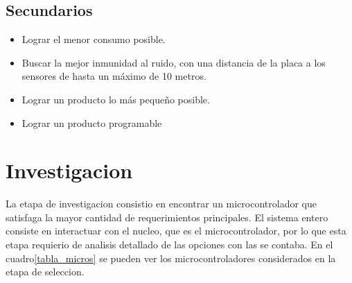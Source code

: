 \documentclass{article}
\theoremstyle{definition}
\theoremstyle{remark}
\begin{document}
\subsection{Secundarios}
\begin{itemize}
  \item Lograr el menor consumo posible.
  \item Buscar la mejor inmunidad al ruido, con una distancia de la placa a los sensores de hasta un máximo de 10 metros.
  \item Lograr un producto lo más pequeño posible.
  \item Lograr un producto programable
\end{itemize}

\section{Investigacion}
La etapa de investigacion consistio en encontrar un microcontrolador que satisfaga la mayor cantidad de requerimientos principales. El sistema entero consiste en interactuar con el nucleo, que es el microcontrolador, por lo que esta etapa requierio de analisis detallado de las opciones con las se contaba. En el cuadro\ref{tabla_micros} se pueden ver los microcontroladores considerados en la etapa de seleccion.

\clearpage
\end{document}
